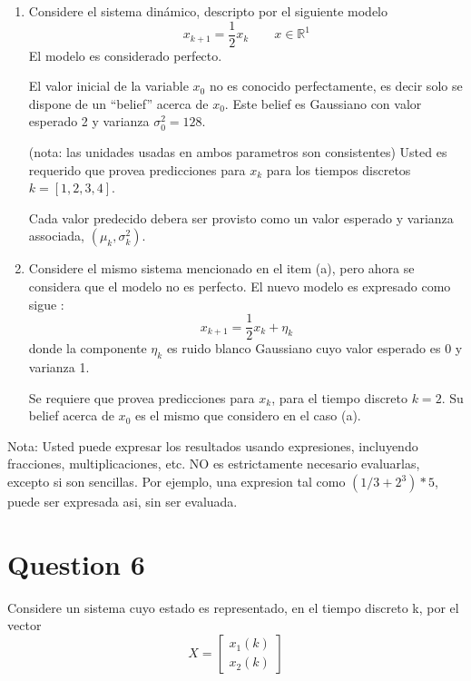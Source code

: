 \documentclass[parcial]{lcc}
\begin{document}
\begin{enumerate}

\item Considere el sistema dinámico, descripto por el siguiente modelo 
\begin{equation*}
    x_{k+1} = \frac{1}{2}x_{k} \qquad x \in \mathbb{R}^{1}
\end{equation*}
El modelo es considerado perfecto.

El valor inicial de la variable $x_0$ no es conocido perfectamente, es decir solo se dispone de un ``belief'' acerca de  $x_0$. Este belief es Gaussiano con valor esperado 2 y varianza $\sigma^2_{0} = 128$.

(nota: las unidades usadas en ambos parametros son consistentes)
Usted es requerido que provea predicciones para $x_k$ para los tiempos discretos $k=[1,2,3,4]$.

Cada valor predecido debera ser provisto como un valor esperado y varianza associada,
$\left(\mu_{k}, \sigma_{k}^2\right)$.

\item Considere el mismo sistema mencionado en el item (a), pero ahora se considera que el modelo no es perfecto. El nuevo modelo es expresado como sigue :
\begin{equation*}
    x_{k+1} = \frac{1}{2}x_k + \eta_k
\end{equation*}
donde la componente $\eta_k$ es ruido blanco Gaussiano cuyo valor esperado es 0 y varianza 1.

Se requiere que provea predicciones para $x_{k}$, para el tiempo discreto $k=2$. Su belief acerca de $x_0$ es el mismo que considero en el caso (a).

\end{enumerate}

Nota: Usted puede expresar los resultados usando expresiones, incluyendo fracciones, multiplicaciones, etc. NO es estrictamente necesario evaluarlas, excepto si son sencillas. Por ejemplo, una expresion tal como $(1/3 +2^3)*5$, puede ser expresada asi, sin ser evaluada.

\section*{Question 6}
Considere un sistema cuyo estado es representado, en el tiempo discreto k, por el vector
\begin{equation*}
    X = \begin{bmatrix}
            x_1(k)\\
            x_2(k)
        \end{bmatrix}
\end{equation*}
\end{document}
